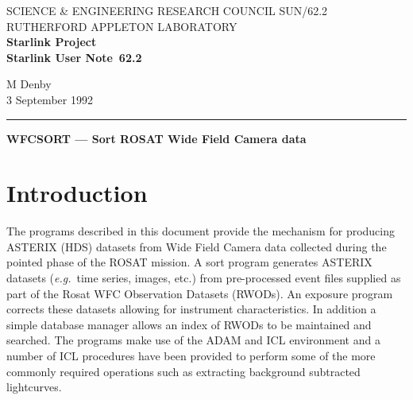 \pagestyle{myheadings}

\newcommand{\stardoccategory}  {Starlink User Note}
\newcommand{\stardocinitials}  {SUN}
\newcommand{\stardocnumber}    {62.2}
\newcommand{\stardocauthors}   {M Denby}
\newcommand{\stardocdate}      {3 September 1992}
\newcommand{\stardoctitle}     {WFCSORT --- Sort ROSAT Wide Field Camera data}

\renewcommand{\_}{{\tt\char'137}}     %
\newcommand{\stardocname}{\stardocinitials /\stardocnumber}
\markright{\stardocname}
\setlength{\textwidth}{160mm}
\setlength{\textheight}{230mm}
\setlength{\topmargin}{-2mm}
\setlength{\oddsidemargin}{0mm}
\setlength{\evensidemargin}{0mm}
\setlength{\parindent}{0mm}
\setlength{\parskip}{\medskipamount}
\setlength{\unitlength}{1mm}



\thispagestyle{empty}
SCIENCE \& ENGINEERING RESEARCH COUNCIL \hfill \stardocname\\
RUTHERFORD APPLETON LABORATORY\\
{\large\bf Starlink Project\\}
{\large\bf \stardoccategory\ \stardocnumber}
\begin{flushright}
\stardocauthors\\
\stardocdate
\end{flushright}
\vspace{-4mm}
\rule{\textwidth}{0.5mm}
\vspace{5mm}
\begin{center}
{\Large\bf \stardoctitle}
\end{center}
\vspace{5mm}

\section{Introduction}

The programs described in this document provide the mechanism for
producing ASTERIX (HDS) datasets from Wide Field Camera data
collected during the pointed phase of the ROSAT mission. A sort program
generates ASTERIX datasets ({\em e.g.}~time series, images, etc.) 
from pre-processed event files supplied as part of
the Rosat WFC Observation Datasets (RWODs). An exposure program
corrects these datasets allowing for
instrument characteristics. In addition a simple database manager
allows an index of RWODs to be maintained and searched.
The programs make use of the ADAM and ICL environment and a number of ICL
procedures have been provided to perform some of the more commonly
required operations such as extracting background subtracted lightcurves.


